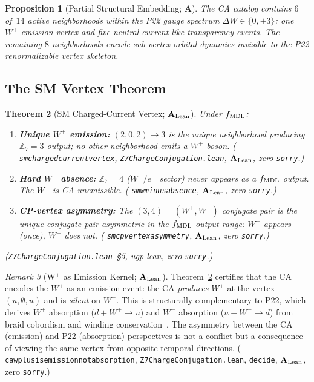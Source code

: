 \documentclass[11pt]{article}
\newtheorem{theorem}{Theorem}[section]
\newtheorem{proposition}[theorem]{Proposition}
\theoremstyle{remark}
\newtheorem{remark}[theorem]{Remark}
\newcommand{\lean}[1]{%
  \penalty-100
  \begingroup\def\_{\textunderscore\allowbreak}\texttt{#1}\endgroup}
\newcommand{\CatA}{\textbf{A}}
\newcommand{\CatAL}{\ensuremath{\textbf{A}_{\rm Lean}}}
\begin{document}
\begin{proposition}[Partial Structural Embedding; $\CatA$]
\label{prop:partial_embedding}
The CA catalog contains $6$ of~$14$ active neighborhoods within the
P22 gauge spectrum $\Delta W \in \{0, \pm 3\}$:
one $W^+$ emission vertex and five neutral-current-like transparency
events.
The remaining $8$ neighborhoods encode sub-vertex orbital dynamics
invisible to the P22 renormalizable vertex skeleton.
\end{proposition}

\subsection{The SM Vertex Theorem}
\label{sec:sm_vertex}

\begin{theorem}[SM Charged-Current Vertex; $\CatAL$]
\label{thm:sm_vertex}
Under $f_{\rm MDL}$:
\begin{enumerate}[nosep,leftmargin=1.5em]
\item \textbf{Unique $W^+$ emission:}
  $(2,0,2) \to 3$ is the unique neighborhood producing $\mathbb{Z}_7 = 3$
  output; no other neighborhood emits a $W^+$ boson.
  (\lean{sm\_charged\_current\_vertex},
  \texttt{Z7ChargeConjugation.lean}, $\CatAL$, zero \texttt{sorry}.)
\item \textbf{Hard $W^-$ absence:}
  $\mathbb{Z}_7 = 4$ ($W^-/e^-$ sector) never appears as a $f_{\rm MDL}$
  output.  The $W^-$ is CA-unemissible.
  (\lean{sm\_w\_minus\_absence}, $\CatAL$, zero \texttt{sorry}.)
\item \textbf{CP-vertex asymmetry:}
  The $(3,4) = (W^+, W^-)$ conjugate pair is the unique conjugate pair
  asymmetric in the $f_{\rm MDL}$ output range: $W^+$ appears (once),
  $W^-$ does not.
  (\lean{sm\_cp\_vertex\_asymmetry}, $\CatAL$, zero \texttt{sorry}.)
\end{enumerate}
(\texttt{Z7ChargeConjugation.lean}~\S5, ugp-lean, zero \texttt{sorry}.)
\end{theorem}

\begin{remark}[W$^+$ as Emission Kernel; $\CatAL$]
Theorem~\ref{thm:sm_vertex} certifies that the CA encodes the $W^+$ as
an emission event: the CA \emph{produces} $W^+$ at the vertex $(u,\emptyset,u)$
and is \emph{silent} on $W^-$.
This is structurally complementary to P22, which derives $W^+$ absorption
($d + W^+ \to u$) and $W^-$ absorption ($u + W^- \to d$) from
braid cobordism and winding conservation~\cite{Spivack2026_UGPDynamics}.
The asymmetry between the CA (emission) and P22 (absorption) perspectives
is not a conflict but a consequence of viewing the same vertex from
opposite temporal directions.
(\lean{ca\_w\_plus\_is\_emission\_not\_absorption},
\texttt{Z7ChargeConjugation.lean},
\lean{decide}, $\CatAL$, zero \texttt{sorry}.)
\end{remark}
\end{document}

